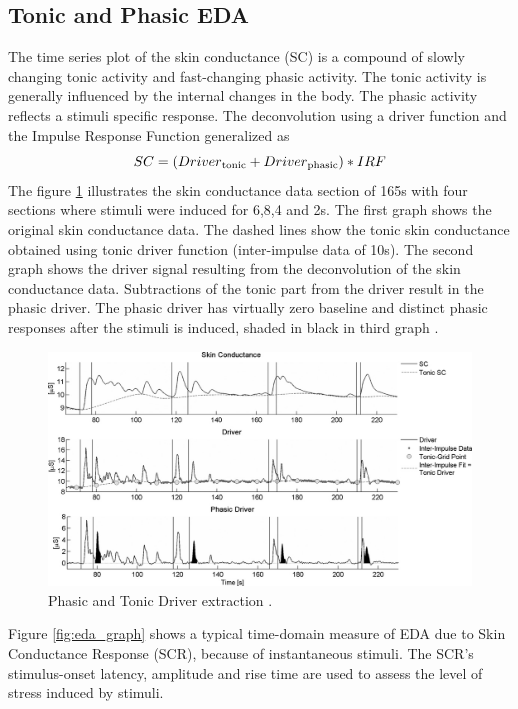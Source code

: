 \subsection{Tonic and Phasic EDA}
\label{sec:tonic_phasic_eda}
The time series plot of the skin conductance (SC) is a compound of slowly changing tonic activity and fast-changing phasic activity. The tonic activity is generally influenced by the internal changes in the body. The phasic activity reflects a stimuli specific response. The deconvolution using a driver function and the Impulse Response Function generalized as
$$SC = (Driver\textsubscript{tonic} + Driver\textsubscript{phasic})*IRF$$
The figure \ref{fig:phasic_tonic_eda} illustrates the skin conductance data section of 165s with four sections where stimuli were induced for 6,8,4 and 2s. The first graph shows the original skin conductance data. The dashed lines show the tonic skin conductance obtained using tonic driver function (inter-impulse data of 10s). The second graph shows the driver signal resulting from the deconvolution of the skin conductance data. Subtractions of the tonic part from the driver result in the phasic driver. The phasic driver has virtually zero baseline and distinct phasic responses after the stimuli is induced, shaded in black in third graph \cite{benedek_continuous_2010}.
\begin{figure}
    \centering
    \includegraphics[width=150mm]{Figures/phasic_tonic_eda.jpg}
    \caption{Phasic and Tonic Driver extraction \cite{benedek_continuous_2010}.}
    \label{fig:phasic_tonic_eda}
\end{figure}


Figure \ref{fig:eda_graph} shows a typical time-domain measure of EDA due to Skin Conductance Response (SCR), because of instantaneous stimuli. The SCR’s stimulus-onset latency, amplitude and rise time are used to assess the level of stress induced by stimuli. 






